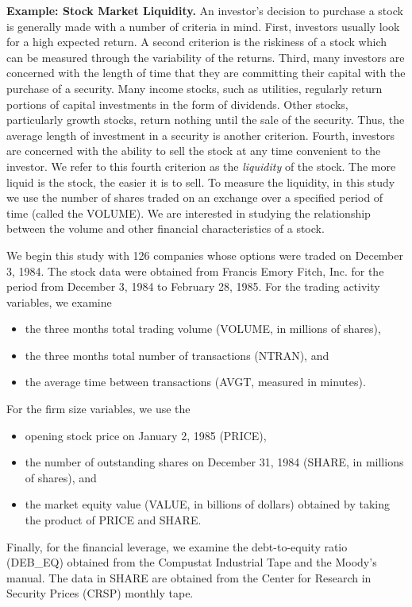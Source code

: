 \textbf{Example: Stock Market Liquidity.} An investor's decision to purchase a stock is generally
made with a number of criteria in mind. First, investors usually
look for a high expected return. A second criterion is the riskiness
of a stock which can be measured through the variability of the
returns. Third, many investors are concerned with the length of time
that they are committing their capital with the purchase of a
security. Many income stocks, such as utilities, regularly return
portions of capital investments in the form of dividends. Other
stocks, particularly growth stocks, return nothing until the sale of
the security. Thus, the average length of investment in a security
is another criterion. Fourth, investors are concerned with the
ability to sell the stock at any time convenient to the investor. We
refer to this fourth criterion as the \textit{liquidity }of the
stock. The more liquid is the stock, the easier it is to sell. To
measure the liquidity, in this study we use the number of shares
traded on an exchange over a specified period of time (called the
VOLUME). We are interested in studying the relationship between the
volume and other financial characteristics of a
stock.

We begin this study with 126 companies whose options were traded on December
3, 1984. The stock data were obtained from Francis Emory Fitch, Inc. for the
period from December 3, 1984 to February 28, 1985. For the trading activity
variables, we examine
\begin{itemize}
\item the three months total trading volume (VOLUME, in millions of shares),
\item the three months total number of transactions (NTRAN), and
\item the average time between transactions (AVGT, measured in minutes).
\end{itemize}
\noindent For the firm size variables, we use the
\begin{itemize}
\item opening stock price on January 2, 1985 (PRICE),
\item  the number of outstanding shares on December 31, 1984 (SHARE, in millions of shares), and
\item  the market equity value (VALUE, in billions of dollars) obtained by taking the product of PRICE and SHARE.
\end{itemize}
\noindent Finally, for the financial leverage, we examine the
debt-to-equity ratio (DEB\_EQ) obtained from the Compustat
Industrial Tape and the Moody's manual. The data in SHARE are
obtained from the Center for Research in Security Prices (CRSP)
monthly tape.

